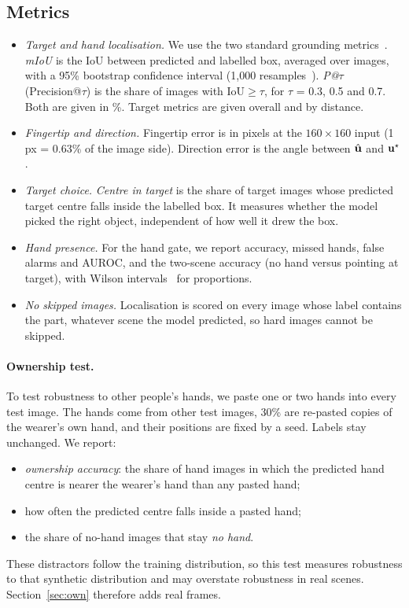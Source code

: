 \subsection{Metrics}\label{sec:metrics}
\begin{itemize}
\item \emph{Target and hand localisation.} We use the two standard grounding metrics~\cite{egopoint,li2026vistaref,li2026pointvgr}. \emph{mIoU} is the IoU between predicted and labelled box, averaged over images, with a 95\% bootstrap confidence interval (1,000 resamples~\cite{efron1994introduction}). \emph{P@$\tau$} (Precision@$\tau$) is the share of images with IoU${\geq}\tau$, for $\tau$ = 0.3, 0.5 and 0.7. Both are given in \%. Target metrics are given overall and by distance.
\item \emph{Fingertip and direction.} Fingertip error is in pixels at the $160\times160$ input (1\,px = 0.63\% of the image side). Direction error is the angle between $\hat{\mathbf{u}}$ and $\mathbf{u}^\star$.
\item \emph{Target choice.} \emph{Centre in target} is the share of target images whose predicted target centre falls inside the labelled box. It measures whether the model picked the right object, independent of how well it drew the box.
\item \emph{Hand presence.} For the hand gate, we report accuracy, missed hands, false alarms and AUROC, and the two-scene accuracy (no hand versus pointing at target), with Wilson intervals~\cite{wilson1927probable} for proportions.
\item \emph{No skipped images.} Localisation is scored on every image whose label contains the part, whatever scene the model predicted, so hard images cannot be skipped.
\end{itemize}

\paragraph{Ownership test.} To test robustness to other people's hands, we paste one or two hands into every test image. The hands come from other test images, 30\% are re-pasted copies of the wearer's own hand, and their positions are fixed by a seed. Labels stay unchanged. We report:
\begin{itemize}
\item \emph{ownership accuracy}: the share of hand images in which the predicted hand centre is nearer the wearer's hand than any pasted hand;
\item how often the predicted centre falls inside a pasted hand;
\item the share of no-hand images that stay \emph{no hand}.
\end{itemize}
These distractors follow the training distribution, so this test measures robustness to that synthetic distribution and may overstate robustness in real scenes. Section~\ref{sec:own} therefore adds real frames.

